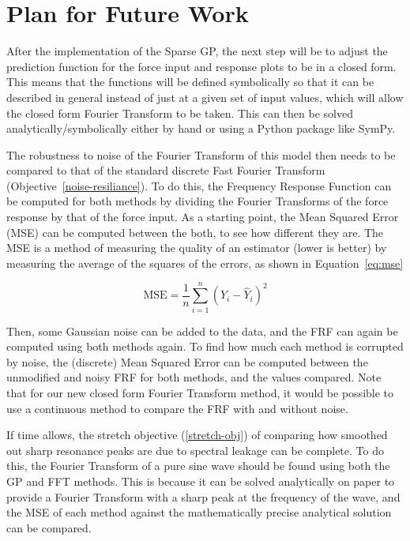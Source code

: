 \documentclass[12pt]{article}
\begin{document}
    \section{Plan for Future Work}
    After the implementation of the Sparse GP, the next step will be to adjust the prediction function for the force input and response plots to be in a closed form.
    This means that the functions will be defined symbolically so that it can be described in general instead of just at a given set of input values, which will allow the closed form Fourier Transform to be taken.
    This can then be solved analytically/symbolically either by hand or using a Python package like SymPy.

    The robustness to noise of the Fourier Transform of this model then needs to be compared to that of the standard discrete Fast Fourier Transform (Objective~\ref{noise-resiliance}).
    To do this, the Frequency Response Function can be computed for both methods by dividing the Fourier Transforms of the force response by that of the force input.
    As a starting point, the Mean Squared Error (MSE) can be computed between the both, to see how different they are.
    The MSE is a method of measuring the quality of an estimator (lower is better) by measuring the average of the squares of the errors, as shown in Equation~\ref{eq:mse}

    \begin{equation}
        \text{MSE} = \frac{1}{n} \sum_{i=1}^{n} (Y_i - \hat{Y}_i)^2
        \label{eq:mse}
    \end{equation}


    Then, some Gaussian noise can be added to the data, and the FRF can again be computed using both methods again.
    To find how much each method is corrupted by noise, the (discrete) Mean Squared Error can be computed between the unmodified and noisy FRF for both methods, and the values compared.
    Note that for our new closed form Fourier Transform method, it would be possible to use a continuous method to compare the FRF with and without noise.

    If time allows, the stretch objective (\ref{stretch-obj}) of comparing how smoothed out sharp resonance peaks are due to spectral leakage can be complete.
    To do this, the Fourier Transform of a pure sine wave should be found using both the GP and FFT methods.
    This is because it can be solved analytically on paper to provide a Fourier Transform with a sharp peak at the frequency of the wave, and the MSE of each method against the mathematically precise analytical solution can be compared.
\end{document}

